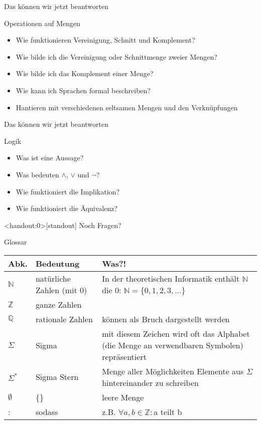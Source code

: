 \begin{frame}[fragile]{Das können wir jetzt beantworten}
    \begin{alertblock}{Operationen auf Mengen}
    \begin{itemize}
        \item Wie funktionieren Vereinigung, Schnitt und Komplement?
        \item Wie bilde ich die Vereinigung oder Schnittmenge zweier Mengen?
        \item Wie bilde ich das Komplement einer Menge?
        \item Wie kann ich Sprachen formal beschreiben?
        \item Hantieren mit verschiedenen seltsamen Mengen und den Verknüpfungen
    \end{itemize}
    \end{alertblock}
\end{frame}

\begin{frame}[fragile]{Das können wir jetzt beantworten}
	\begin{alertblock}{Logik}
		\begin{itemize}
			\item Was ist eine Aussage?
			\item Was bedeuten $\wedge$, $\vee$ und $\neg$?
			\item Wie funktioniert die Implikation?
			\item Wie funktioniert die Äquivalenz?
		\end{itemize}
	\end{alertblock}
\end{frame}

\begin{frame}<handout:0>[standout]
  Noch Fragen?
\end{frame}

\begin{frame}[fragile]{Glossar}
    \small
    \begin{tabular}{p{} p{} p{}}
    \toprule
    Abk.&Bedeutung&Was?!\\
    \midrule
        $\mathbb{N}$&natürliche Zahlen (mit 0)&In der theoretischen Informatik enthält $\mathbb{N}$ die 0: $\mathbb{N}=\{0,1,2,3,\dots\}$\\
        $\mathbb{Z}$&ganze Zahlen&\\
        $\mathbb{Q}$&rationale Zahlen&können als Bruch dargestellt werden\\
        $\Sigma$ & Sigma& mit diesem Zeichen wird oft das Alphabet (die Menge an verwendbaren Symbolen) repräsentiert\\
        $\Sigma^\ast$&Sigma Stern&Menge aller Möglichkeiten Elemente aus $\Sigma$ hintereinander zu schreiben\\
        $\emptyset$&\{\}&leere Menge\\
        :&sodass&z.B. $\forall a,b\in\mathbb{Z}:$a teilt b\\
    \bottomrule
    \end{tabular}
\end{frame}


